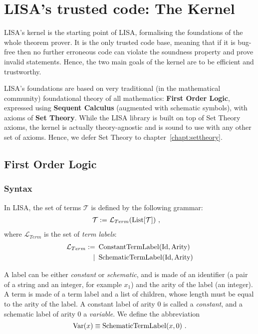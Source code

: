 \chapter{LISA's trusted code: The Kernel}
\label{chapt:kernel}
LISA's kernel is the starting point of LISA, formalising the foundations of the whole theorem prover. It is the only trusted code base, meaning that if it is bug-free then no further erroneous code can violate the soundness property and prove invalid statements. Hence, the two main goals of the kernel are to be efficient and trustworthy.


LISA's foundations are based on very traditional (in the mathematical community) foundational theory of all mathematics: \textbf{First Order Logic}, expressed using \textbf{Sequent Calculus} (augmented with schematic symbols), with axioms of \textbf{Set Theory}.
While the LISA library is built on top of Set Theory axioms, the kernel is actually theory-agnostic and is sound to use with any other set of axioms. Hence, we defer Set Theory to chapter~\ref{chapt:settheory}.

\section{First Order Logic}
\label{sec:FOL}
\subsection{Syntax}
\begin{definition}[Terms]
  In LISA, the set of terms $\mathcal{T}$ is defined by the following grammar:
  \begin{align}
    \mathcal{T} := & ~\mathcal{L}_{Term}(\operatorname{List}[\mathcal{T}])~,
  \end{align}
  where $\mathcal{L}_{Term}$ is the set of \textit{term labels}:
  \begin{align}
    \mathcal{L}_{Term} := & ~\operatorname{ConstantTermLabel}(\textnormal{Id}, \textnormal{Arity})  \\
    \mid                  & ~\operatorname{SchematicTermLabel}(\textnormal{Id}, \textnormal{Arity})
  \end{align}

  A label can be either \textit{constant} or \textit{schematic}, and is made of an identifier (a pair of a string and an integer, for example $x_1$) and the arity of the label (an integer).
  A term is made of a term label and a list of children, whose length must be equal to the arity of the label.
  A constant label of arity $0$ is called a \emph{constant}, and a schematic label of arity $0$ a \emph{variable}.
  We define the abbreviation
  $$
    \operatorname{Var}(x) \equiv \operatorname{SchematicTermLabel}(x, 0)~.
  $$
\end{definition}

